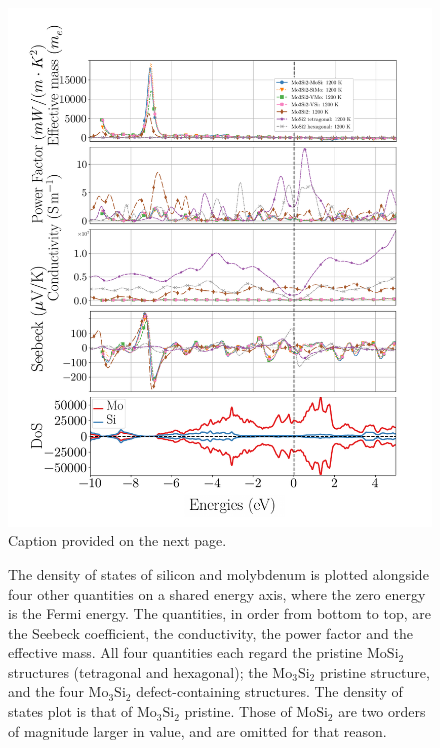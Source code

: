 \documentclass[12pt]{article}
\theoremstyle{plain}
\theoremstyle{definition}
\newcommand{\<}{\langle}
\renewcommand{\>}{\rangle}
\begin{document}
\begin{figure} [b!]
\label{fig:e-plots}
\centering
\hspace*{-0.04\textwidth}\includegraphics[width=1.08\textwidth]{E-plots}
\caption{Caption provided on the next page.}
\end{figure}
\addtocounter{figure}{-1}
\begin{figure} [t!]
  \caption{The density of states of silicon and molybdenum is plotted alongside four other quantities on a shared energy axis, where the zero energy is the Fermi energy. The quantities, in order from bottom to top, are the Seebeck coefficient, the conductivity, the power factor and the effective mass. All four quantities each regard the pristine $\text{Mo}\text{Si}_2$ structures (tetragonal and hexagonal); the $\text{Mo}_3\text{Si}_2$ pristine structure, and the four $\text{Mo}_3\text{Si}_2$ defect-containing structures. The density of states plot is that of $\text{Mo}_3\text{Si}_2$ pristine. Those of $\text{Mo}\text{Si}_2$ are two orders of magnitude larger in value, and are omitted for that reason.}
\end{figure}
\end{document}
